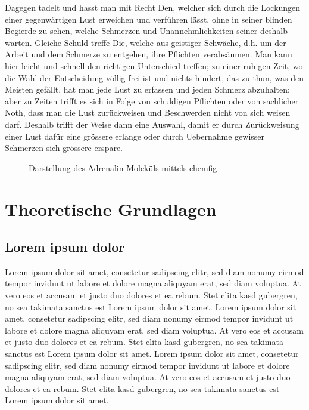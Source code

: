 \documentclass[ %
	DIV=15,
	BCOR=14mm, %
	parskip=half, %
	headsepline, %
	cleardoublepage=empty, %
	tablecaptionabove, %
	toc=bib, %
	toc=listofnumbered, %
	listof=leveldown, %
	numbers=noendperiod %
	]{scrbook}
\begin{document}
Dagegen tadelt und hasst man mit Recht Den, welcher sich durch die Lockungen einer gegenwärtigen Lust erweichen und verführen lässt, ohne in seiner blinden Begierde zu sehen, welche Schmerzen und Unannehmlichkeiten seiner deshalb warten. Gleiche Schuld treffe Die, welche aus geistiger Schwäche, d.h. um der Arbeit und dem Schmerze zu entgehen, ihre Pflichten verabsäumen. Man kann hier leicht und schnell den richtigen Unterschied treffen; zu einer ruhigen Zeit, wo die Wahl der Entscheidung völlig frei ist und nichts hindert, das zu thun, was den Meisten gefällt, hat man jede Lust zu erfassen und jeden Schmerz abzuhalten; aber zu Zeiten trifft es sich in Folge von schuldigen Pflichten oder von sachlicher Noth, dass man die Lust zurückweisen und Beschwerden nicht von sich weisen darf. Deshalb trifft der Weise dann eine Auswahl, damit er durch Zurückweisung einer Lust dafür eine grössere erlange oder durch Uebernahme gewisser Schmerzen sich grössere erspare.

\begin{figure}[htbp]
\begin{center}
	\caption{Darstellung des Adrenalin-Moleküls mittels chemfig}
\end{center}
\end{figure}


\chapter{Theoretische Grundlagen} %
\label{cha:theoretische_grundlagen}

\section{Lorem ipsum dolor} %
\label{sec:lorem_ipsum_dolor}

Lorem ipsum dolor sit amet, consetetur sadipscing elitr, sed diam nonumy eirmod tempor invidunt ut labore et dolore magna aliquyam erat, sed diam voluptua. At vero eos et accusam et justo duo dolores et ea rebum. Stet clita kasd gubergren, no sea takimata sanctus est Lorem ipsum dolor sit amet. Lorem ipsum dolor sit amet, consetetur sadipscing elitr, sed diam nonumy eirmod tempor invidunt ut labore et dolore magna aliquyam erat, sed diam voluptua. At vero eos et accusam et justo duo dolores et ea rebum. Stet clita kasd gubergren, no sea takimata sanctus est Lorem ipsum dolor sit amet. Lorem ipsum dolor sit amet, consetetur sadipscing elitr, sed diam nonumy eirmod tempor invidunt ut labore et dolore magna aliquyam erat, sed diam voluptua. At vero eos et accusam et justo duo dolores et ea rebum. Stet clita kasd gubergren, no sea takimata sanctus est Lorem ipsum dolor sit amet.
\end{document}
